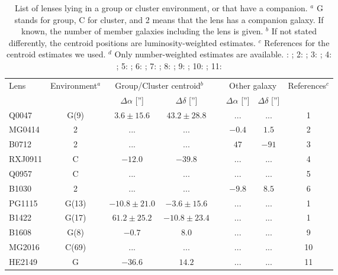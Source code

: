 \documentclass[useAMS,usenatbib]{mn2e}
\begin{document}
\begin{table}
 \begin{center}
  \begin{tabular}{l c c c c c c c}
   \multirow{2}{*}{Lens} & \multirow{2}{*}{Environment$^{a}$} & \multicolumn{2}{c}{Group/Cluster centroid$^{b}$} & & \multicolumn{2}{c}{Other galaxy} & \multirow{2}{*}{References$^{c}$}\\ \cline{3-4} \cline{6-7}
    & & $\Delta\alpha$ [''] & $\Delta\delta$ [''] & & $\Delta\alpha$ [''] & $\Delta\delta$ ['']\\ \hline \hline
   Q0047 & G(9) & $3.6\pm15.6$ & $43.2\pm28.8$ &   & ... & ... & 1\\
   MG0414 & 2 & ... & ... &   & $-0.4$ & $1.5$ & 2\\
   B0712 & 2 & ... & ... &   & $47$ & $-91$ & 3\\
   RXJ0911 & C & $-12.0$ & $-39.8$ &    & ... & ... & 4\\
   Q0957 & C & ... & ... &   & ... & ... & 5\\
   B1030 & 2 & ... & ... &   & $-9.8$ & $8.5$ & 6\\
   PG1115 & G(13) & $-10.8\pm21.0$ & $-3.6\pm15.6$ &   & ... & ... & 1\\
   B1422 & G(17) & $61.2\pm25.2$ & $-10.8\pm23.4$ &   & ... & ... & 1\\
   B1608 & G(8) & $-0.7$ & $8.0$ &   & ... & ... & 9\\
   MG2016 & C(69) & ... & ... &   & ... & ... & 10\\
   HE2149 & G & $-36.6$ & $14.2$ &   & ... & ... & 11\\
  \end{tabular}
  \caption{List of lenses lying in a group or cluster environment, or that have a companion. \newline $^{a}$ G stands for group, C for cluster, and 2 means that the lens has a companion galaxy. If known, the number of member galaxies including the lens is given. \newline $^{b}$ If not stated differently, the centroid positions are luminosity-weighted estimates. \newline $^{c}$ References for the centroid estimates we used. \newline $^{d}$ Only number-weighted estimates are available. : \cite{2011ApJ...726...84W}; 2: \cite{1993AJ....105....1S}; 3: \cite{2002AJ....123..627F}; 4: \cite{2001ApJ...555....1M}; 5: \cite{1998ApJ...504..661C}; 6: \cite{2000ApJ...536..584L}; 7: \cite{2008ApJ...673..778A}; 8: \cite{2007AJ....134..668A}; 9: \cite{2003MNRAS.344..337T}; 10: \cite{2006ApJ...646...85W}; 11: \cite{2006ApJ...646...85W}}
  \label{tab:environment}
 \end{center}
\end{table}
\end{document}
